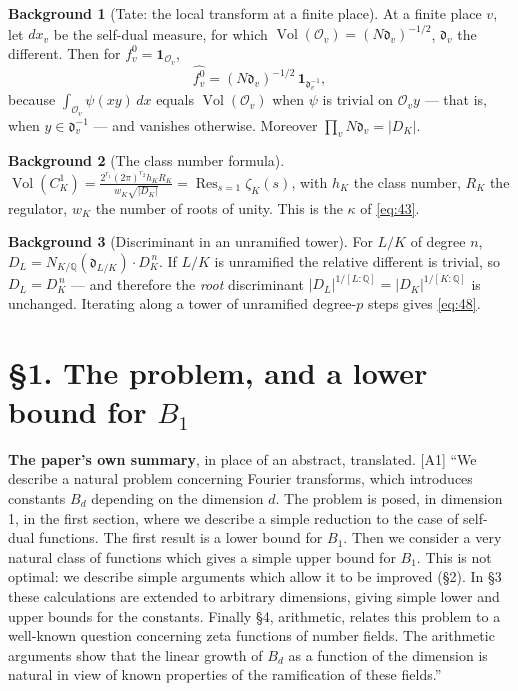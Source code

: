 \documentclass[11pt,reqno]{amsart}
\theoremstyle{plain}
\theoremstyle{definition}
\newtheorem*{bg}{Background}
\theoremstyle{remark}
\newcommand{\Q}{\mathbb{Q}}
\DeclareMathOperator{\Res}{Res}
\newcommand{\Ledger}[1]{{\scriptsize\textsf{[#1]}}}
\begin{document}
\begin{bg}[Tate: the local transform at a finite place]\label{bg:tateloc}
At a finite place $v$, let $dx_v$ be the self-dual measure, for which
$\operatorname{Vol}(\mathcal O_v)=(N\mathfrak d_v)^{-1/2}$, $\mathfrak d_v$ the
different. Then for $f_v^0=\mathbf 1_{\mathcal O_v}$,
\[\widehat{f_v^0}=(N\mathfrak d_v)^{-1/2}\,\mathbf 1_{\mathfrak d_v^{-1}},\]
because $\int_{\mathcal O_v}\psi(xy)\,dx$ equals $\operatorname{Vol}(\mathcal O_v)$
when $\psi$ is trivial on $\mathcal O_vy$ --- that is, when
$y\in\mathfrak d_v^{-1}$ --- and vanishes otherwise. Moreover
$\prod_v N\mathfrak d_v=|D_K|$.
\end{bg}

\begin{bg}[The class number formula]\label{bg:cnf}
$\displaystyle\operatorname{Vol}(C_K^1)
 =\frac{2^{r_1}(2\pi)^{r_2}h_KR_K}{w_K\sqrt{|D_K|}}
 =\Res_{s=1}\zeta_K(s)$, with $h_K$ the class number, $R_K$ the regulator, $w_K$ the
number of roots of unity. This is the $\kappa$ of \eqref{eq:43}.
\end{bg}

\begin{bg}[Discriminant in an unramified tower]\label{bg:disc}
For $L/K$ of degree $n$, $D_L=N_{K/\Q}(\mathfrak d_{L/K})\cdot D_K^{\,n}$. If $L/K$ is
unramified the relative different is trivial, so $D_L=D_K^{\,n}$ --- and therefore the
\emph{root} discriminant $|D_L|^{1/[L:\Q]}=|D_K|^{1/[K:\Q]}$ is unchanged. Iterating
along a tower of unramified degree-$p$ steps gives \eqref{eq:48}.
\end{bg}

\section*{\S1. The problem, and a lower bound for $B_1$}

\begin{ournotation}
\textbf{The paper's own summary}, in place of an abstract, translated. \Ledger{A1}
``We describe a natural problem concerning Fourier transforms, which introduces
constants $B_d$ depending on the dimension $d$. The problem is posed, in dimension 1,
in the first section, where we describe a simple reduction to the case of self-dual
functions. The first result is a lower bound for $B_1$. Then we consider a very
natural class of functions which gives a simple upper bound for $B_1$. This is not
optimal: we describe simple arguments which allow it to be improved (\S2). In \S3
these calculations are extended to arbitrary dimensions, giving simple lower and upper
bounds for the constants. Finally \S4, arithmetic, relates this problem to a well-known
question concerning zeta functions of number fields. The arithmetic arguments show that
the linear growth of $B_d$ as a function of the dimension is natural in view of known
properties of the ramification of these fields.''
\end{ournotation}
\end{document}
